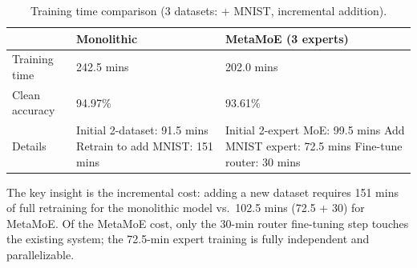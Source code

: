 \documentclass[runningheads]{llncs}
\begin{document}
\begin{table}[H]
\centering
\caption{Training time comparison (3 datasets: + MNIST, incremental addition).}
\label{tab:train-3ds}
\small
\begin{tabular}{@{}lp{3.8cm}p{3.8cm}@{}}
\toprule
 & \textbf{Monolithic} & \textbf{\textsf{MetaMoE} (3 experts)} \\
\midrule
Training time & 242.5 mins & 202.0 mins \\
Clean accuracy & 94.97\% & 93.61\% \\
Details & Initial 2-dataset: 91.5 mins \newline Retrain to add MNIST: 151 mins & Initial 2-expert MoE: 99.5 mins \newline Add MNIST expert: 72.5 mins \newline Fine-tune router: 30 mins \\
\bottomrule
\end{tabular}
\end{table}

The key insight is the incremental cost: adding a new dataset requires 151 mins of full retraining for the monolithic model vs.\ 102.5 mins (72.5 + 30) for \textsf{MetaMoE}. Of the \textsf{MetaMoE} cost, only the 30-min router fine-tuning step touches the existing system; the 72.5-min expert training is fully independent and parallelizable.




\end{document}

